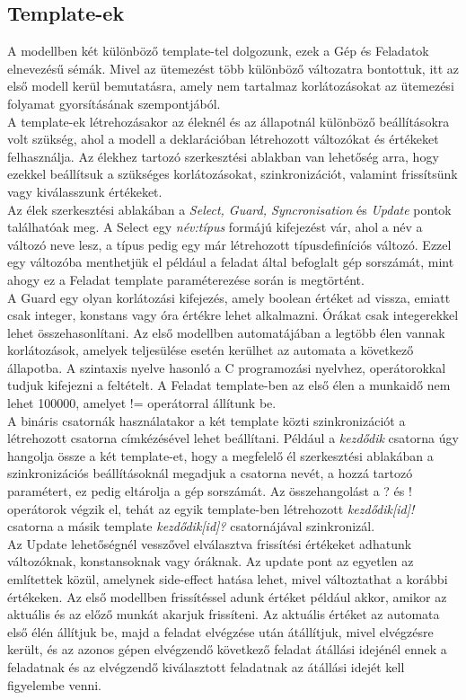\documentclass [12pt]{report}
\begin{document}
    \subsection{Template-ek}
    A modellben két különböző template-tel dolgozunk, ezek a Gép és Feladatok elnevezésű sémák. Mivel az ütemezést több különböző változatra bontottuk, itt az első modell kerül bemutatásra, amely nem tartalmaz korlátozásokat az ütemezési folyamat gyorsításának szempontjából.\\
    A template-ek létrehozásakor az éleknél és az állapotnál különböző beállításokra volt szükség, ahol a modell a deklarációban létrehozott változókat és értékeket felhasználja.
    Az élekhez tartozó szerkesztési ablakban van lehetőség arra, hogy ezekkel beállítsuk a szükséges korlátozásokat, szinkronizációt, valamint frissítsünk vagy kiválasszunk értékeket.\\
    Az élek szerkesztési ablakában a \emph{Select, Guard, Syncronisation} és \emph{Update} pontok találhatóak meg. A Select egy \emph{név:típus} formájú kifejezést vár, ahol a név a változó neve lesz, a típus pedig egy már létrehozott típusdefiníciós változó. Ezzel egy változóba menthetjük el például a feladat által befoglalt gép sorszámát, mint ahogy ez a Feladat template paraméterezése során is megtörtént. \\
    A Guard egy olyan korlátozási kifejezés, amely boolean értéket ad vissza, emiatt csak integer, konstans vagy óra értékre lehet alkalmazni. Órákat csak integerekkel lehet összehasonlítani. Az első modellben automatájában a legtöbb élen vannak korlátozások, amelyek teljesülése esetén kerülhet az automata a következő állapotba. A szintaxis nyelve hasonló a C programozási nyelvhez, operátorokkal tudjuk kifejezni a feltételt. A Feladat template-ben az első élen a munkaidő nem lehet 100000, amelyet != operátorral állítunk be.\\
    A bináris csatornák használatakor a két template közti szinkronizációt a létrehozott csatorna címkézésével lehet beállítani. Például a \emph{kezdődik} csatorna úgy hangolja össze a két template-et, hogy a megfelelő él szerkesztési ablakában a szinkronizációs beállításoknál megadjuk a csatorna nevét, a hozzá tartozó paramétert, ez pedig eltárolja a gép sorszámát. Az összehangolást a ? és !  operátorok végzik el, tehát az egyik template-ben létrehozott \emph{kezdődik[id]!} csatorna a másik template \emph{kezdődik[id]?} csatornájával szinkronizál.\\
    Az Update lehetőségnél vesszővel elválasztva frissítési értékeket adhatunk változóknak, konstansoknak vagy óráknak. Az update pont az egyetlen az említettek közül, amelynek side-effect hatása lehet, mivel változtathat a korábbi értékeken. Az első modellben frissítéssel adunk értéket például akkor, amikor az aktuális és az előző munkát akarjuk frissíteni. Az aktuális értéket az automata első élén állítjuk be, majd a feladat elvégzése után átállítjuk, mivel elvégzésre került, és az azonos gépen elvégzendő következő feladat átállási idejénél ennek a feladatnak és az elvégzendő kiválasztott feladatnak az átállási idejét kell figyelembe venni.\\
\end{document}
